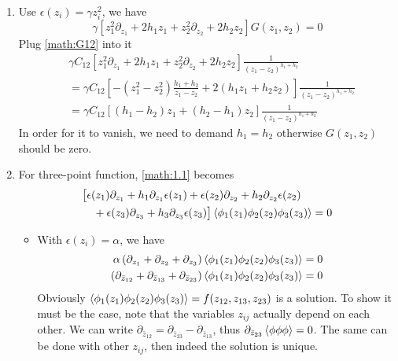 \begin{enumerate}
	\item Use $\epsilon(z_i) = \gamma z_i^2$, we have
		\begin{equation*}
			\gamma \left[ z_1^2 \partial_{z_1} + 2h_1z_1 + z_2^2 \partial_{z_2} + 2 h_2 z_2  \right] G(z_1,z_2) = 0
		\end{equation*}	
		Plug \eqref{math:G12} into it
		\begin{align*}
			&\gamma C_{12}  \left[ z_1^2 \partial_{z_1} + 2h_1z_1 + z_2^2 \partial_{z_2} + 2 h_2 z_2  \right] \frac{1}{(z_1 - z_2)^{h_1 + h_2}} \\
			&= \gamma C_{12} \left[ -(z_1^2-z_2^2) \frac{h_1 + h_2}{z_1 - z_2} + 2(h_1 z_1 + h_2 z_2)  \right] \frac{1}{(z_1 - z_2)^{h_1 + h_2}} \\
			&= \gamma C_{12} \left[ (h_1 - h_2)z_1 + (h_2 - h_1)z_2   \right]  \frac{1}{(z_1 - z_2)^{h_1 + h_2}}
		\end{align*}
		In order for it to vanish, we need to demand $h_1 = h_2$ otherwise $G(z_1, z_2)$ should be zero.
	\item For three-point function, \eqref{math:1.1} becomes
	\begin{align}
		\begin{split}
			&\big[ \epsilon(z_1)\partial_{z_1} + h_1 \partial_{z_1} \epsilon(z_1) +  \epsilon(z_2)\partial_{z_2} + h_2 \partial_{z_2} \epsilon(z_2) \\
			&\quad + \epsilon(z_3)\partial_{z_3} + h_3 \partial_{z_3} \epsilon(z_3)\big] \expval{\phi_1 (z_1) \phi_2(z_2) \phi_3(z_3)} = 0 \\
		\end{split}
	\end{align}
	\begin{itemize}
		\item With $\epsilon(z_i)=\alpha$, we have
			\begin{align}
				\alpha \left( \partial_{z_1} + \partial_{z_2} + \partial_{z_3} \right)\expval{\phi_1 (z_1) \phi_2(z_2) \phi_3(z_3)} &= 0 \notag \\
				\left( \partial_{\bar{z}_{12}} + \partial_{\bar{z}_{13}} + \partial_{\bar{z}_{23}} \right) \expval{\phi_1 (z_1) \phi_2(z_2) \phi_3(z_3)} &= 0 
			\end{align}
			Obviously $\expval{\phi_1 (z_1) \phi_2(z_2) \phi_3(z_3)} = f(z_{12}, z_{13},z_{23})$ is a solution. To show it must be the case, note that the variables $z_{ij}$ actually depend on each other. We can write $\partial_{\bar{z}_{12}} = \partial_{\bar{z}_{23}} - \partial_{\bar{z}_{13}}$, thus $\partial_{\bar{z}_{23}}\expval{\phi \phi \phi} = 0$. The same can be done with other $z_{ij}$, then indeed the solution is unique.


\end{itemize}
\end{enumerate}
